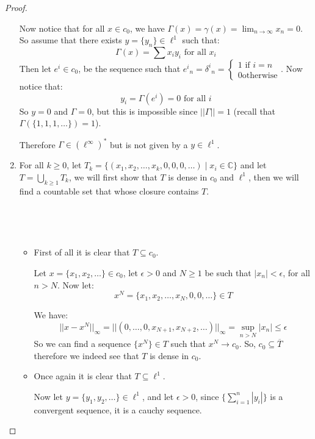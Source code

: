 \documentclass{article}
\newcommand{\C}{\mathbb{C}}
\theoremstyle{definition}
\theoremstyle{remark}
\theoremstyle{definition}
\begin{document}
\begin{proof}
\begin{enumerate}[label = (\alph*)]
Now notice that for all $x\in c_0$, we have $\Gamma(x) = \gamma(x) = \lim_{n\rightarrow \infty} x_n = 0$. So assume that there exists $y=\{y_n\}\in \ell^1$ such that:\begin{equation}
    \Gamma(x) = \sum {x_i}{y_i} \text{ for all } x_i
\end{equation}
Then let $e^i\in c_0$, be the sequence such that ${e^i}_n = {\delta^i}_n = \begin{cases}1\text{ if }i=n\\ 0\text{otherwise}\end{cases}$. Now notice that:\begin{equation}
    y_i = \Gamma(e^i) = 0 \text{ for all }i
\end{equation}  
So $y = 0$ and $\Gamma = 0$, but this is impossible since $||\Gamma|| = 1$ (recall that $\Gamma(\{1,1,1,\dots\}) = 1$).

Therefore $\Gamma\in {(\ell^\infty)}^\ast$ but is not given by a $y\in \ell^1$.

\item For all $k\geq 0$, let $T_k = \{(x_1,x_2,\dots,x_k,0,0,0,\dots)\mid x_i\in \C\}$ and let $T=\bigcup_{k\geq 1}T_k$, we will first show that $T$ is dense in $c_0$ and $\ell^1$,
then we will find a countable set that whose closure contains $T$.

\


\

\begin{itemize}
    \item First of all it is clear that $T\subseteq c_0$.

    Let $x = \{x_1,x_2,\dots\}\in c_0$, let $\epsilon>0$ and $N\geq 1$ be such that $|x_n|<\epsilon$, for all $n>N$. Now let: 
    \begin{equation} x^N = \{x_1,x_2,\dots,x_N,0,0,\dots\}\in T\end{equation}  

We have: \begin{equation}
    ||x-x^N||_\infty = ||(0,\dots,0,x_{N+1},x_{N+2},\dots)||_\infty = \sup_{n>N}|x_n|\leq \epsilon
\end{equation}
So we can find a sequence $\{x^N\}\in T$ such that $x^N\rightarrow c_0$. So, $c_0\subseteq \overline{T}$ therefore we indeed see that $T$ is dense in $c_0$.

    \item Once again it is clear that $T\subseteq \ell^1$.
    
    Now let $y=\{y_1,y_2,\dots\}\in \ell^1$, and let $\epsilon>0$, since $\{\sum_{i=1}^n |y_i|\}$ is a convergent sequence, it is a cauchy sequence. 


\end{itemize}
\end{enumerate}
\end{proof}
\end{document}
